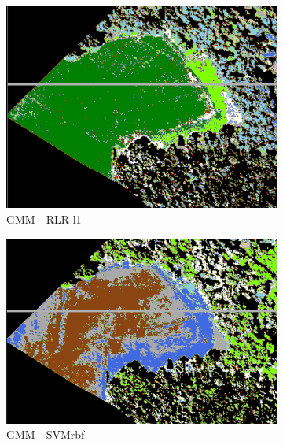 \documentclass{siamart171218}
\begin{document}
\begin{figure}[h!]
        \begin{subfigure}[b]{0.25\textwidth}
                \centering
                \includegraphics[width=0.92\linewidth]{images/Rejet_peintures_GMM_Log_reg_l1_T0.50_Jachere.png}
                \caption{GMM - RLR l1}
                \label{fig:GMM_LRL1_2}
        \end{subfigure}%
        \begin{subfigure}[b]{0.25\textwidth}
                \centering
                \includegraphics[width=1\linewidth]{images/Rejet_peintures_GMM_SVM_rbf_T0.50_Jachere.png}
                \caption{GMM - SVMrbf}
                \label{fig:GMM_SVMrbf_2}
        \end{subfigure}%
        \begin{subfigure}[b]{0.25\textwidth}
                \centering

\end{subfigure}
\end{figure}
\end{document}
